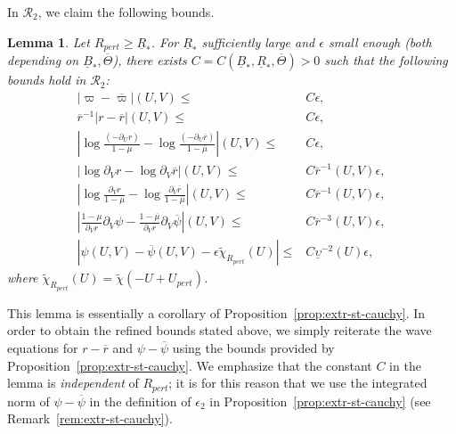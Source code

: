 \documentclass[10pt, reqno]{amsart}
\newtheorem{lemma}[theorem]{Lemma}
\theoremstyle{definition}
\theoremstyle{remark}
\theoremstyle{conjecture}
\numberwithin{equation}{section}
\newcommand{\rd}{\partial}
\newcommand{\0}{\emptyset}
\newcommand{\eps}{\epsilon}
\newcommand{\Tht}{\Theta}
\newcommand{\ups}{\upsilon}
\newcommand{\calR}{\mathcal R}
\newcommand{\psibg}{\overline{\psi}}				%
\newcommand{\rbg}{\overline{r}}					%
\newcommand{\varpibg}{\overline{\varpi}}				%
\newcommand{\mubg}{\overline{\mu}}				%
\newcommand{\Abs}[1]{\left\vert #1 \right\vert}
\begin{document}
In $\calR_{2}$, we claim the following bounds.
\begin{lemma} \label{lem:inst-s}
Let $R_{pert} \geq \underline{R}_{\ast}$. For $\underline{R}_{\ast}$ sufficiently large and $\eps$ small enough (both depending on $\underline{B}_{\ast}, \overline{\Tht}$), there exists $C = C(\underline{B}_{\ast}, \underline{R}_{\ast}, \overline{\Tht}) > 0$ such that the following bounds hold in $\calR_{2}$:
\begin{align} 
	\Abs{\varpi - \varpibg }(U, V) \leq & C \eps,  \label{eq:inst-s:mdf} \\
	\rbg^{-1} \Abs{r - \rbg }(U, V) \leq & C \eps,  \label{eq:inst-s:rdf} \\
	\Abs{\log \frac{(-\rd_{U} r)}{1-\mu} - \log \frac{(-\rd_{U} \rbg)}{1-\mubg}} (U, V) \leq & C \eps, \label{eq:inst-s:loggmmdf}\\	
	\Abs{\log \rd_{V} r - \log \rd_{V} \rbg} (U, V) \leq & C \rbg^{-1} (U, V) \eps, \label{eq:inst-s:logdvrdf} \\
	\Abs{\log \frac{\rd_{V} r}{1-\mu} - \log \frac{\rd_{V} \rbg}{1-\mubg}} (U, V) \leq & C \rbg^{-1} (U, V) \eps, \label{eq:inst-s:logkppdf} \\
	\Abs{\frac{1-\mu}{\rd_{V} r} \rd_{V} \psi - \frac{1-\mubg}{\rd_{V} \rbg} \rd_{V} \psibg} (U, V) \leq & C \rbg^{-3} (U, V) \eps, \label{eq:inst-s:dvpsidf} \\
	\Abs{\psi (U, V) - \psibg (U, V) - \eps \tilde{\chi}_{R_{pert}} (U)} \leq & C \underline{\ups}^{-2}(U) \eps , \label{eq:inst-s:psidf} 
\end{align}
where $\tilde{\chi}_{R_{pert}} (U) = \tilde{\chi}(- U + U_{pert})$.
\end{lemma}
This lemma is essentially a corollary of Proposition~\ref{prop:extr-st-cauchy}. In order to obtain the refined bounds stated above, we simply reiterate the wave equations for $r - \rbg$ and $\psi - \psibg$ using the bounds provided by Proposition~\ref{prop:extr-st-cauchy}. We emphasize that the constant $C$ in the lemma is \emph{independent} of $R_{pert}$; it is for this reason that we use the integrated norm of $\psi - \psibg$ in the definition of $\eps_{2}$ in Proposition~\ref{prop:extr-st-cauchy} (see Remark~\ref{rem:extr-st-cauchy}).
\end{document}
